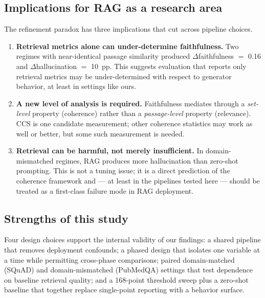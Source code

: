 \subsection{Implications for RAG as a research area}

The refinement paradox has three implications that cut across pipeline
choices.

\begin{enumerate}
  \item \textbf{Retrieval metrics alone can under-determine
        faithfulness.} Two regimes with near-identical passage similarity
        produced $\Delta$faithfulness $=$ 0.16 and $\Delta$hallucination
        $=$ 10~pp. This suggests evaluation that reports only retrieval
        metrics may be under-determined with respect to generator
        behavior, at least in settings like ours.

  \item \textbf{A new level of analysis is required.} Faithfulness
        mediates through a \emph{set-level} property (coherence) rather
        than a \emph{passage-level} property (relevance). CCS is one
        candidate measurement; other coherence statistics may work as
        well or better, but some such measurement is needed.

  \item \textbf{Retrieval can be harmful, not merely insufficient.} In
        domain-mismatched regimes, RAG produces more hallucination than
        zero-shot prompting. This is not a tuning issue; it is a
        direct prediction of the coherence framework and — at least in
        the pipelines tested here — should be treated as a first-class
        failure mode in RAG deployment.
\end{enumerate}

\subsection{Strengths of this study}

Four design choices support the internal validity of our findings: a
shared pipeline that removes deployment confounds; a phased design that
isolates one variable at a time while permitting cross-phase
comparisons; paired domain-matched (SQuAD) and domain-mismatched
(PubMedQA) settings that test dependence on baseline retrieval quality;
and a 168-point threshold sweep plus a zero-shot baseline that together
replace single-point reporting with a behavior surface.

